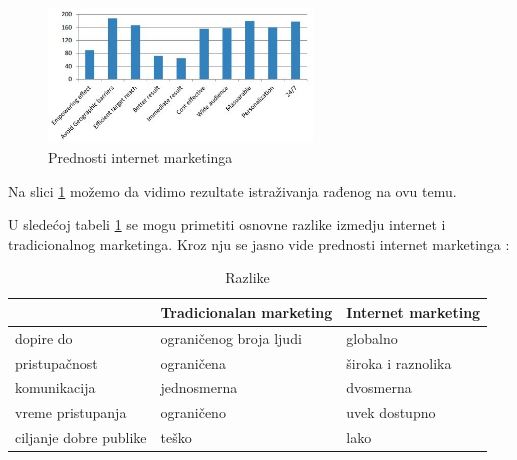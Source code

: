 \documentclass[a4paper]{article}
\begin{document}
{\begin{figure}[h!]
\begin{center}
\includegraphics[width=7cm]{slika.prednosti.marketinga.jpg}
\end{center}
\caption{Prednosti internet marketinga}
\label{fig:prednosti}
\end{figure}
{Na slici \ref{fig:prednosti} možemo da vidimo rezultate istraživanja rađenog na ovu temu. }

U slede\'{c}oj tabeli \ref{tab:tabela1}  se mogu primetiti osnovne razlike izmedju internet i tradicionalnog marketinga. Kroz nju se jasno vide prednosti internet marketinga :

\begin{table}[h!]
\begin{center}
\caption{Razlike}
\begin{tabular}{|p{2cm}|p{3.1cm}|p{3.1cm}|} \hline
     &\centering Tradicionalan marketing& Internet marketing\\ \hline
 \centering dopire do& ograničenog broja \centering ljudi & globalno\\   \hline
\centering pristupačnost & ograničena& široka i raznolika\\ \hline
\centering komunikacija & jednosmerna& dvosmerna\\\hline
 \centering vreme pristupanja& ograničeno& uvek dostupno \\ \hline
\centering ciljanje dobre  publike &  teško &  lako  \\ \hline
\end{tabular}
\label{tab:tabela1}
\end{center}
\end{table}



}
\end{document}

